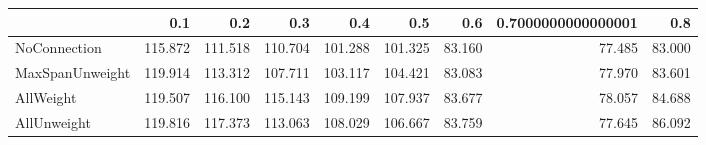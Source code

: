 \begin{tabular}{lrrrrrrrr}
\toprule
{} &     0.1 &     0.2 &     0.3 &     0.4 &     0.5 &    0.6 & 0.7000000000000001 &    0.8 \\
\midrule
NoConnection    & 115.872 & 111.518 & 110.704 & 101.288 & 101.325 & 83.160 &             77.485 & 83.000 \\
MaxSpanUnweight & 119.914 & 113.312 & 107.711 & 103.117 & 104.421 & 83.083 &             77.970 & 83.601 \\
AllWeight       & 119.507 & 116.100 & 115.143 & 109.199 & 107.937 & 83.677 &             78.057 & 84.688 \\
AllUnweight     & 119.816 & 117.373 & 113.063 & 108.029 & 106.667 & 83.759 &             77.645 & 86.092 \\
\bottomrule
\end{tabular}

